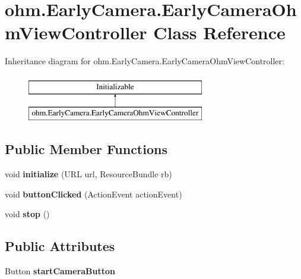 \hypertarget{classohm_1_1_early_camera_1_1_early_camera_ohm_view_controller}{}\section{ohm.\+Early\+Camera.\+Early\+Camera\+Ohm\+View\+Controller Class Reference}
\label{classohm_1_1_early_camera_1_1_early_camera_ohm_view_controller}
Inheritance diagram for ohm.\+Early\+Camera.\+Early\+Camera\+Ohm\+View\+Controller\+:\begin{figure}[H]
\begin{center}
\leavevmode
\includegraphics[height=2.000000cm]{classohm_1_1_early_camera_1_1_early_camera_ohm_view_controller}
\end{center}
\end{figure}
\subsection*{Public Member Functions}
\begin{DoxyCompactItemize}
\item 
\hypertarget{classohm_1_1_early_camera_1_1_early_camera_ohm_view_controller_a7ddc65b3762b7fcfaea84f3887147d71}{}\label{classohm_1_1_early_camera_1_1_early_camera_ohm_view_controller_a7ddc65b3762b7fcfaea84f3887147d71} 
void {\bfseries initialize} (U\+RL url, Resource\+Bundle rb)
\item 
\hypertarget{classohm_1_1_early_camera_1_1_early_camera_ohm_view_controller_adbb830f00717bbf65cf08a791a8e01dc}{}\label{classohm_1_1_early_camera_1_1_early_camera_ohm_view_controller_adbb830f00717bbf65cf08a791a8e01dc} 
void {\bfseries button\+Clicked} (Action\+Event action\+Event)
\item 
\hypertarget{classohm_1_1_early_camera_1_1_early_camera_ohm_view_controller_a6334b3d5227e643a09a645e22267b448}{}\label{classohm_1_1_early_camera_1_1_early_camera_ohm_view_controller_a6334b3d5227e643a09a645e22267b448} 
void {\bfseries stop} ()
\end{DoxyCompactItemize}
\subsection*{Public Attributes}
\begin{DoxyCompactItemize}
\item 
\hypertarget{classohm_1_1_early_camera_1_1_early_camera_ohm_view_controller_ad43ca8ce1fa322ef1197017dfd535620}{}\label{classohm_1_1_early_camera_1_1_early_camera_ohm_view_controller_ad43ca8ce1fa322ef1197017dfd535620} 
Button {\bfseries start\+Camera\+Button}
\end{DoxyCompactItemize}


